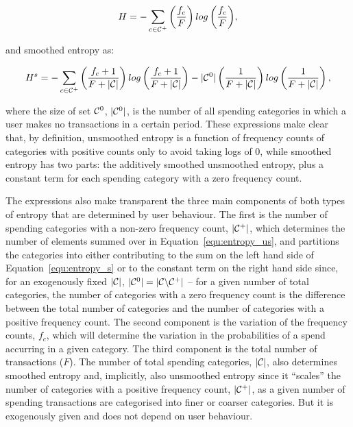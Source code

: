 \begin{equation}
\label{equ:entropy_us}
H = -\sum_{c \in \mathcal{C}^{+}}{\left(\frac{f_c}{F}\right)
log\left(\frac{f_c}{F}\right)},
\end{equation}

and smoothed entropy as:

\begin{equation}
\label{equ:entropy_s}
H^s = -\sum_{c \in \mathcal{C}^{+}}{\left(\frac{f_c + 1}{F + |\mathcal{C}|}\right)
log\left(\frac{f_c + 1}{F + |\mathcal{C}|}\right)}
- |\mathcal{C}^{0}|\left(\frac{1}{F + |\mathcal{C}|}\right)
log\left(\frac{1}{F + |\mathcal{C}|}\right),
\end{equation}

\noindent where the size of set $\mathcal{C}^{0}$, $|\mathcal{C}^{0}|$, is the number of all
spending categories in which a user makes no transactions in a certain period.
These expressions make clear that, by definition, unsmoothed entropy is a
function of frequency counts of categories with positive counts only to avoid
taking logs of 0, while smoothed entropy has two parts: the additively smoothed
unsmoothed entropy, plus a constant term for each spending category with a zero
frequency count.

The expressions also make transparent the three main components of both types
of entropy that are determined by user behaviour. The first is the number of
spending categories with a non-zero frequency count, $|\mathcal{C}^{+}|$, which
determines the number of elements summed over in Equation~\ref{equ:entropy_us},
and partitions the categories into either contributing to the sum on the left
hand side of Equation~\ref{equ:entropy_s} or to the constant term on the right
hand side since, for an exogenously fixed $|\mathcal{C}|$, $|\mathcal{C}^{0}| = |\mathcal{C}
\backslash \mathcal{C}^{+}|$ -- for a given number of total categories, the number of
categories with a zero frequency count is the difference between the total
number of categories and the number of categories with a positive frequency
count. The second component is the variation of the frequency counts, $f_c$,
which will determine the variation in the probabilities of a spend accurring in
a given category. The third component is the total number of transactions
($F$). The number of total spending categories, $|\mathcal{C}|$, also determines
smoothed entropy and, implicitly, also unsmoothed entropy since it ``scales''
the number of categories with a positive frequency count, $|\mathcal{C}^{+}|$, as a
given number of spending transactions are categorised into finer or coarser
categories. But it is exogenously given and does not depend on user behaviour.

